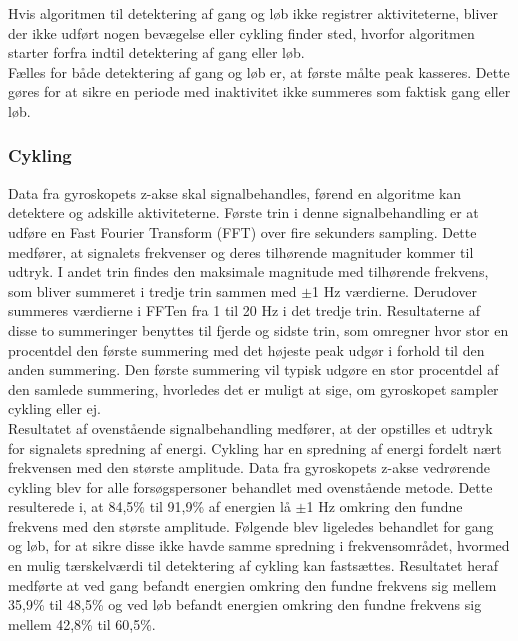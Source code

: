 Hvis algoritmen til detektering af gang og løb ikke registrer aktiviteterne, bliver der ikke udført nogen bevægelse eller cykling finder sted, hvorfor algoritmen starter forfra indtil detektering af gang eller løb. \\
Fælles for både detektering af gang og løb er, at første målte peak kasseres. Dette gøres for at sikre en periode med inaktivitet ikke summeres som faktisk gang eller løb. 

\subsubsection{Cykling}
Data fra gyroskopets z-akse skal signalbehandles, førend en algoritme kan detektere og adskille aktiviteterne. Første trin i denne signalbehandling er at udføre en Fast Fourier Transform (FFT) over fire sekunders sampling. Dette medfører, at signalets frekvenser og deres tilhørende magnituder kommer til udtryk. I andet trin findes den maksimale magnitude med tilhørende frekvens, som bliver summeret i tredje trin sammen med $\pm$1 Hz værdierne. Derudover %
summeres værdierne i FFTen fra 1 til 20 Hz i det tredje trin. Resultaterne af disse to summeringer benyttes til fjerde og sidste trin, som omregner hvor stor en procentdel den første summering med det højeste peak udgør i forhold til den anden summering. Den første summering vil typisk udgøre en stor procentdel af den samlede summering, hvorledes det er muligt at sige, om gyroskopet sampler cykling eller ej.\\
Resultatet af ovenstående signalbehandling medfører, at der opstilles et udtryk for signalets spredning af energi. Cykling har en spredning af energi fordelt nært frekvensen med den største amplitude. Data fra gyroskopets z-akse vedrørende cykling blev for alle forsøgspersoner behandlet med ovenstående metode. Dette resulterede i, at 84,5\% til 91,9\% af energien lå $\pm$1 Hz omkring den fundne frekvens med den største amplitude. Følgende blev ligeledes behandlet for gang og løb, for at sikre disse ikke havde samme spredning i frekvensområdet, hvormed en mulig tærskelværdi til detektering af cykling kan fastsættes. Resultatet heraf medførte at ved gang befandt energien omkring den fundne frekvens sig mellem 35,9\% til 48,5\% og ved løb befandt energien omkring den fundne frekvens sig mellem 42,8\% til 60,5\%. \\
